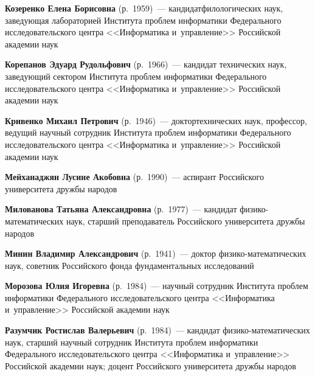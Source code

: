 \begin{multicols}{2}
 \vspace*{3pt}

 \noindent
\textbf{Козеренко Елена Борисовна} (р.\ 1959)~---
кандидат\linebreak филологических наук, заведующая лабораторией Института проблем
информатики Федерального исследовательского центра <<Информатика и~управ\-ле\-ние>>
Российской академии наук

 \vspace*{3pt}

 \noindent
\textbf{Корепанов Эдуард Рудольфович} (р.\ 1966)~---
кандидат технических наук, заведующий сектором Института проблем информатики
Федерального исследовательского центра <<Информатика и~управ\-ле\-ние>>
Российской академии наук


 \noindent
\textbf{Кривенко Михаил Петрович} (р.\ 1946)~---
 доктор\linebreak технических наук, профессор, ведущий научный сотрудник
 Института проблем информатики Федерального исследовательского центра
 <<Информатика и~управление>> Российской академии наук

  \vspace*{3pt}

    \noindent
\textbf{Мейханаджян Лусине Акобовна} (р.\ 1990)~--- аспирант Российского университета
  дружбы народов

   \vspace*{3pt}

   \noindent
\textbf{Милованова Татьяна Александровна} (р.\ 1977)~---
кандидат фи\-зи\-ко-ма\-те\-ма\-ти\-че\-ских наук,
старший преподаватель Российского университета дружбы народов

 \vspace*{3pt}

 \noindent
\textbf{Минин Владимир Александрович} (р.\ 1941)~---
доктор фи\-зи\-ко-ма\-те\-ма\-ти\-че\-ских наук, советник Российского фонда
фундаментальных исследований

 \vspace*{3pt}

 \noindent
\textbf{Морозова Юлия Игоревна} (р.\ 1984)~---
научный сотрудник Института проблем информатики Федерального исследовательского
центра <<Информатика и~управ\-ле\-ние>>   Российской академии наук

 \vspace*{3pt}

 \noindent
\textbf{Разумчик Ростислав Валерьевич} (р.\ 1984)~---
кандидат фи\-зи\-ко-ма\-те\-ма\-ти\-че\-ских наук,
старший научный сотрудник Института проблем информатики Федерального
исследовательского центра <<Информатика и~управ\-ле\-ние>> Российской академии наук;
доцент Российского университета дружбы народов


\end{multicols}
